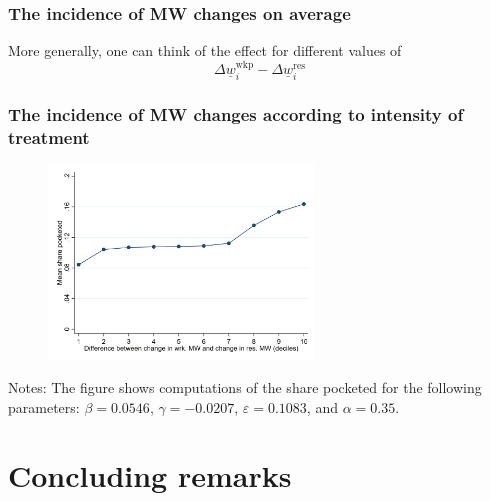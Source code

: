 \documentclass[aspectratio=169, t]{beamer}
\newcommand{\mw}{\underline{w}}
\newcommand{\wkp}{\text{wkp}}
\newcommand{\res}{\text{res}}
\begin{document}
\begin{frame}
    \frametitle{The incidence of MW changes on average}
    
    \vspace{1mm}
    

    \pause
    \vspace{3mm}
    More generally, one can think of the effect for different values of 
    $$
        \Delta \mw_i^{\wkp} - \Delta \mw_i^{\res}
    $$
\end{frame}

\begin{frame}
    \frametitle{The incidence of MW changes according to intensity of treatment}
    
    \begin{figure}
        \includegraphics[width = 0.63\textwidth]{counterfactuals/output/deciles_diff.png}
    \end{figure}
    \vspace{.5mm}
    \footnotesize
    Notes: The figure shows computations of the share pocketed for the following
    parameters: $\beta = 0.0546$, $\gamma = -0.0207$, $\varepsilon = 0.1083$, and $\alpha=0.35$.
\end{frame}

\section{Concluding remarks}
\end{document}
